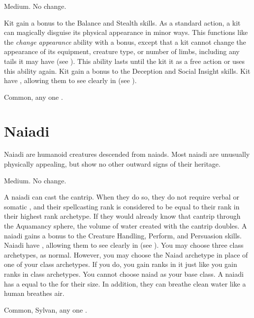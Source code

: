      Medium.
     No change.
    \begin{itemize}
         Kit gain a  bonus to the Balance and Stealth skills.
         As a standard action, a kit can magically disguise its physical appearance in minor ways.
            This functions like the \textit{change appearance} ability with a  bonus, except that a kit cannot change the appearance of its equipment, creature type, or number of limbs, including any tails it may have (see ).
            This ability lasts until the kit  it as a free action or uses this ability again.
         Kit gain a  bonus to the Deception and Social Insight skills.
         Kit have , allowing them to see clearly in  (see ).
    \end{itemize}
     Common, any one .

\section{Naiadi}
    Naiadi are humanoid creatures descended from naiads.
    Most naiadi are unusually physically appealing, but show no other outward signs of their heritage.

     Medium.
     No change.
    \begin{itemize}
         A naiadi can cast the  cantrip.
            When they do so, they do not require verbal or somatic , and their spellcasting rank is considered to be equal to their rank in their highest rank archetype.
            If they would already know that cantrip through the Aquamancy sphere, the volume of water created with the cantrip doubles.
         A naiadi gains a  bonus to the Creature Handling, Perform, and Persuasion skills.
         Naiadi have , allowing them to see clearly in  (see ).
         You may choose three class archetypes, as normal.
            However, you may choose the Naiad archetype in place of one of your class archetypes.
            If you do, you gain ranks in it just like you gain ranks in class archetypes.
            You cannot choose naiad as your base class.
         A naiadi has a  equal to the  for their size.
            In addition, they can breathe clean water like a human breathes air.
    \end{itemize}
     Common, Sylvan, any one .

